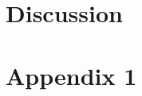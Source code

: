 \documentclass[preprint]{revtex4-1}
\begin{document}
    \section{Discussion}


    \section{Appendix 1}


    
\end{document}

